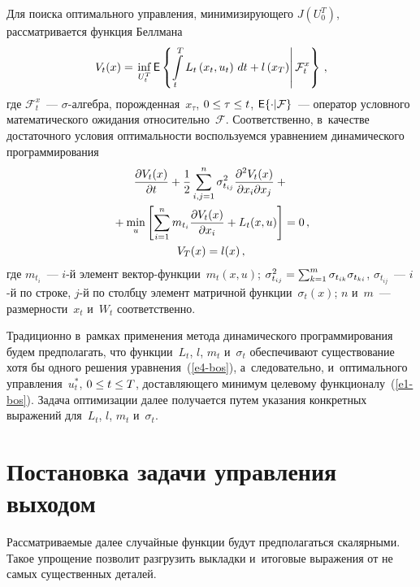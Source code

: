 \begin{multicols}{2}
     Для поиска оптимального управления, минимизирующего $J(U_0^T)$, 
рас\-смат\-ри\-ва\-ет\-ся функция Беллмана
     \begin{equation}
     V_t(x)=\left.\mathop{\mathrm{inf}}\limits_{U_t^T} {\sf E} \left\{ \int\limits_t^T 
L_t \left( x_t, u_t\right)\,dt+l\left( x_T\right) \right\vert \mathcal{F}_t^x\right\}\,,
     \label{e3-bos}
     \end{equation}
где $\mathcal{F}_t^x$~--- $\sigma$-ал\-геб\-ра, по\-рож\-ден\-ная~$x_\tau$, 
$0\hm\leq \tau\hm\leq t$, ${\sf E}\{\cdot\vert \mathcal{F}\}$~--- оператор условного 
математического ожидания относительно~$\mathcal{F}$. Соответственно, 
в~качестве достаточного условия оп\-ти\-маль\-ности воспользуемся уравнением 
динамического программирования
\begin{multline}
\displaystyle\frac{\displaystyle \partial V_t(x)\mathstrut}{\displaystyle \partial t\mathstrut} +\displaystyle\frac{\displaystyle 1\mathstrut}{\displaystyle 2\mathstrut}\sum\limits^n_{i,j=1} \sigma^2_{t_{ij}}
\displaystyle\frac{\displaystyle \partial^2 V_t(x)\mathstrut}{\displaystyle \partial x_i \partial x_j\mathstrut}+{}\\
{}+\min\limits_u\left[  
\sum\limits^n_{i=1} m_{t_i} \displaystyle\frac{\displaystyle \partial V_t(x)\mathstrut}{\displaystyle \partial x_i\mathstrut} + L_t(x,u)\right] 
=0\,,\\
V_T(x)=l(x)\,,
\label{e4-bos}
\end{multline}
где $m_{t_i}$~--- $i$-й элемент век\-тор-функ\-ции~$m_t(x,u)$; 
$\sigma^2_{t_{ij}} \hm= \sum\nolimits^m_{k=1} 
\sigma_{t_{ik}}\sigma_{t_{ki}}$, $\sigma_{t_{ij}}$~--- $i$-й по строке, $j$-й 
по столб\-цу элемент мат\-рич\-ной функции~$\sigma_t(x)$; $n$ и~$m$~--- 
размерности~$x_t$ и~$W_t$ соответственно.

     Традиционно в~рамках применения метода динамического 
программирования будем предполагать, что функции~$L_t$, $l$, $m_t$ 
и~$\sigma_t$ обеспечивают существование хотя бы одного решения 
уравнения~(\ref{e4-bos}), а~следовательно, и~оптимального 
управления~$u_t^*$, $0\hm\leq t\hm\leq T$, до\-став\-ля\-юще\-го минимум 
целевому функционалу~(\ref{e1-bos}). Задача оптимизации далее получается 
путем указания конкретных выражений для~$L_t$, $l$, $m_t$ и~$\sigma_t$.

\section{Постановка задачи управления выходом}

     Рассматриваемые далее случайные функции будут предполагаться 
скалярными. Такое упрощение позволит разгрузить выкладки и~итоговые 
выражения от не самых существенных деталей.
     

\end{multicols}
